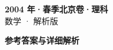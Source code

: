 \documentclass[zihao=-4, a4paper]{ctexart}
\begin{document}
\begin{center}
  {\Large\bfseries 2004 年·春季北京卷·理科}\\[4pt]
  {\large 数学 · 解析版}
\end{center}
\medskip
{}

\clearpage
{}
\begin{center}{\Large\bfseries 参考答案与详细解析}\end{center}
\medskip

\end{document}
